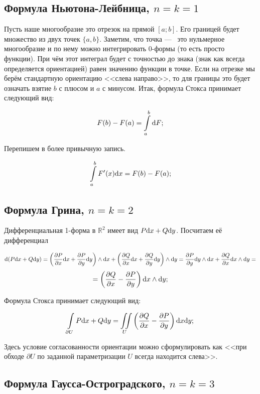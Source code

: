 \documentclass{article}
\begin{document}
	\subsection*{Формула Ньютона-Лейбница, $n = k = 1$}

	Пусть наше многообразие это отрезок на прямой $[a; b]$. Его границей будет множество из двух точек $\{a, b\}$. Заметим, что точка ---~ это нульмерное многообразие и по нему можно интегрировать 0-формы (то есть просто функции). При чём этот интеграл будет с точностью до знака (знак как всегда определяется ориентацией) равен значению функции в точке. Если на отрезке мы берём стандартную ориентацию <<слева направо>>, то для границы это будет означать взятие $b$ с плюсом и $a$ с минусом. Итак, формула Стокса принимает следующий вид:
	
	\[F(b) - F(a) = \int\limits_a^b \mathrm{d} F; \]
	
	Перепишем в более привычную запись.

	\[\int\limits_a^b F'(x) \mathrm{d} x = F(b) - F(a); \]

	\subsection*{Формула Грина, $n = k = 2$}

	Дифференциальная 1-форма в $\mathbb{R}^2$ имеет вид $P\mathrm{d} x + Q \mathrm{d} y$. Посчитаем её дифференциал

	\[\mathrm{d} (P \mathrm{d} x + Q \mathrm{d} y) = \left(\frac{\partial P}{\partial x}\mathrm{d} x + \frac{\partial P}{\partial y}\mathrm{d} y \right) \land \mathrm{d} x +\left(\frac{\partial Q}{\partial x}\mathrm{d} x + \frac{\partial Q}{\partial y}\mathrm{d} y \right) \land \mathrm{d} y = \frac{\partial P}{\partial y} \mathrm{d} y \land \mathrm{d} x + \frac{\partial Q}{\partial x} \mathrm{d} x \land \mathrm{d} y = \] \[ = \left(\frac{\partial Q}{\partial x} - \frac{\partial P}{\partial y}\right) \mathrm{d} x \land \mathrm{d} y;  \]

	Формула Стокса принимает следующий вид:

	\[\int\limits_{\partial U} P\mathrm{d} x + Q\mathrm{d} y = \iint\limits_{U} \left(\frac{\partial Q}{\partial x} - \frac{\partial P}{\partial y}\right)\mathrm{d} x \mathrm{d} y; \]

	Здесь условие согласованности ориентации можно сформулировать как <<при обходе $\partial U$ по заданной параметризации $U$ всегда находится слева>>.

	\subsection*{Формула Гаусса-Остроградского, $n = k = 3$}
\end{document}
